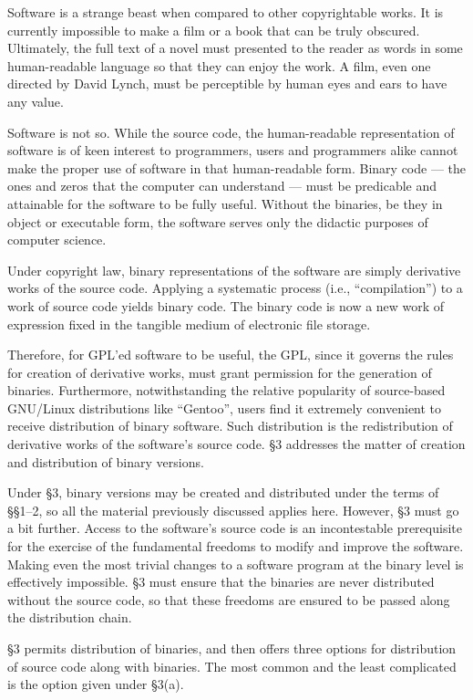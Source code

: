 \documentclass[12pt]{report}
\begin{document}
Software is a strange beast when compared to other copyrightable works.
It is currently impossible to make a film or a book that can be truly
obscured.  Ultimately, the full text of a novel must presented to the
reader as words in some human-readable language so that they can enjoy the
work.  A film, even one directed by David Lynch, must be perceptible by
human eyes and ears to have any value.

Software is not so.  While the source code, the human-readable
representation of software is of keen interest to programmers, users and
programmers alike cannot make the proper use of software in that
human-readable form.  Binary code --- the ones and zeros that the computer
can understand --- must be predicable and attainable for the software to
be fully useful.  Without the binaries, be they in object or executable
form, the software serves only the didactic purposes of computer science.

Under copyright law, binary representations of the software are simply
derivative works of the source code.  Applying a systematic process (i.e.,
``compilation'') to a work of source code yields binary code.  The binary
code is now a new work of expression fixed in the tangible medium of
electronic file storage.

Therefore, for GPL'ed software to be useful, the GPL, since it governs the
rules for creation of derivative works, must grant permission for the
generation of binaries.  Furthermore, notwithstanding the relative
popularity of source-based GNU/Linux distributions like ``Gentoo'', users
find it extremely convenient to receive distribution of binary software.
Such distribution is the redistribution of derivative works of the
software's source code.  \S 3 addresses the matter of creation and
distribution of binary versions.

Under \S 3, binary versions may be created and distributed under the terms
of \S\S 1--2, so all the material previously discussed applies here.
However, \S 3 must go a bit further.  Access to the software's source code
is an incontestable prerequisite for the exercise of the fundamental
freedoms to modify and improve the software.  Making even the most trivial
changes to a software program at the binary level is effectively
impossible.  \S 3 must ensure that the binaries are never distributed
without the source code, so that these freedoms are ensured to be passed
along the distribution chain.

\S 3 permits distribution of binaries, and then offers three options for
distribution of source code along with binaries.  The most common and the
least complicated is the option given under \S 3(a).
\end{document}
